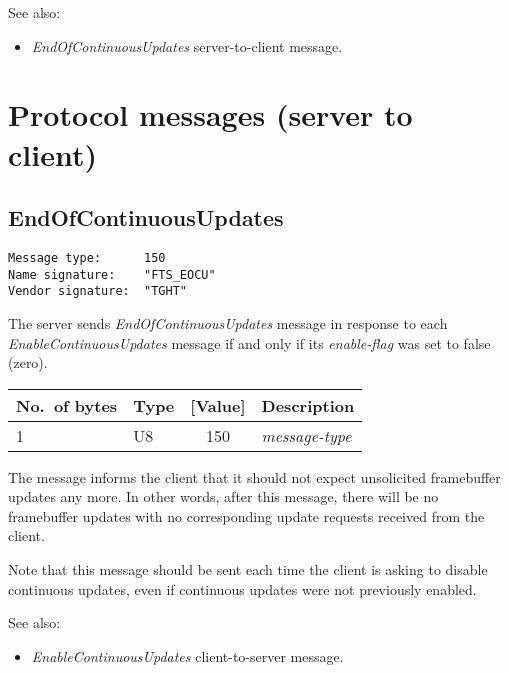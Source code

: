 \documentclass[a4paper]{article}
\newcommand{\typestr}[1]{\textit{#1}}
\begin{document}
See also:
\begin{itemize}
\item \typestr{EndOfContinuousUpdates} server-to-client message.
\end{itemize}

\newpage
\section{Protocol messages (server to client)}

\subsection{EndOfContinuousUpdates}
\begin{verbatim}
Message type:      150
Name signature:    "FTS_EOCU"
Vendor signature:  "TGHT"
\end{verbatim}

The server sends \typestr{EndOfContinuousUpdates} message in response
to each \typestr{EnableContinuousUpdates} message if and only if its
\typestr{enable-flag} was set to false (zero).

\begin{tabular}{l|lc|l} \hline
No.\ of bytes & Type & [Value] & Description \\ \hline
1 & U8  & 150 & \typestr{message-type} \\
\hline\end{tabular}

The message informs the client that it should not expect unsolicited
framebuffer updates any more. In other words, after this message,
there will be no framebuffer updates with no corresponding update
requests received from the client.

Note that this message should be sent each time the client is asking
to disable continuous updates, even if continuous updates were not
previously enabled.

See also:
\begin{itemize}
\item \typestr{EnableContinuousUpdates} client-to-server message.
\end{itemize}
\end{document}
